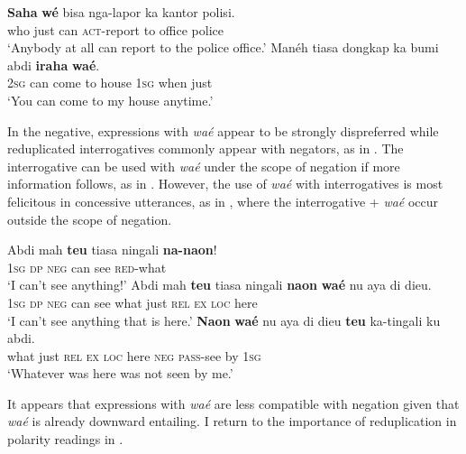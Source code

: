 \documentclass[output=paper]{langscibook}
\begin{document}
 \ea\label{ex:sun:42}
    \ea\label{ex:sun:42a}
        \gll  \textbf{Saha} \textbf{wé} bisa nga-lapor ka kantor polisi.\\ 
              who just can \textsc{act}{}-report to office police\\
        \glt ‘Anybody at all can report to the police office.’
    \ex\label{ex:sun:42b}
        \gll  Manéh tiasa dongkap ka bumi abdi \textbf{iraha} \textbf{waé}.\\
              2\textsc{sg} can come to house 1\textsc{sg} when just\\
        \glt ‘You can come to my house anytime.’ \citep[178]{Butters2021}
    \z
\z 

In the negative, expressions with \textit{waé} appear to be strongly dispreferred while reduplicated interrogatives commonly appear with negators, as in . The interrogative can be used with \textit{waé} under the scope of negation if more information follows, as in . However, the use of \textit{waé} with interrogatives is most felicitous in concessive utterances, as in , where the interrogative + \textit{waé} occur outside the scope of negation. 

\ea\label{ex:sun:43}
    \ea\label{ex:sun:43a}
        \gll  Abdi mah \textbf{teu} tiasa ningali \textbf{na-naon}!\\ 
              1\textsc{sg} \textsc{dp} \textsc{neg} can see \textsc{red}-what\\
        \glt ‘I can’t see anything!’
    \ex\label{ex:sun:43b}
        \gll  Abdi mah \textbf{teu} tiasa ningali \textbf{naon} \textbf{waé} nu aya di dieu. \\
              1\textsc{sg} \textsc{dp} \textsc{neg} can see what just \textsc{rel} \textsc{ex} \textsc{loc} here\\
        \glt ‘I can’t see anything that is here.’
    \ex\label{ex:sun:43c}
        \gll  \textbf{Naon} \textbf{waé} nu aya di dieu \textbf{teu} ka-tingali ku abdi. \\
              what just \textsc{rel} \textsc{ex} \textsc{loc} here \textsc{neg} \textsc{pass}{}-see by 1\textsc{sg}\\
        \glt ‘Whatever was here was not seen by me.’ \citep[179]{Butters2021}
    \z
\z 

It appears that expressions with \textit{waé} are less compatible with negation given that \textit{waé} is already downward entailing. I return to the importance of reduplication in polarity readings in . 
\end{document}
